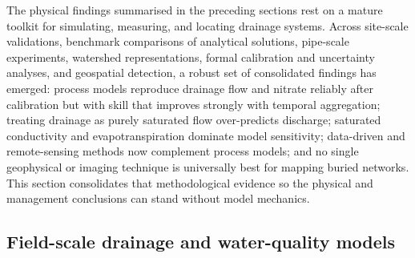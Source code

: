 The physical findings summarised in the preceding sections rest on a mature
toolkit for simulating, measuring, and locating drainage systems. Across
site-scale validations, benchmark comparisons of analytical solutions,
pipe-scale experiments, watershed representations, formal calibration and
uncertainty analyses, and geospatial detection, a robust set of consolidated
findings has emerged: process models reproduce drainage flow and nitrate
reliably after calibration but with skill that improves strongly with temporal
aggregation; treating drainage as purely saturated flow over-predicts
discharge; saturated conductivity and evapotranspiration dominate model
sensitivity; data-driven and remote-sensing methods now complement process
models; and no single geophysical or imaging technique is universally best for
mapping buried networks. This section consolidates that methodological
evidence so the physical and management conclusions can stand without model
mechanics.

\subsection{Field-scale drainage and water-quality models}


